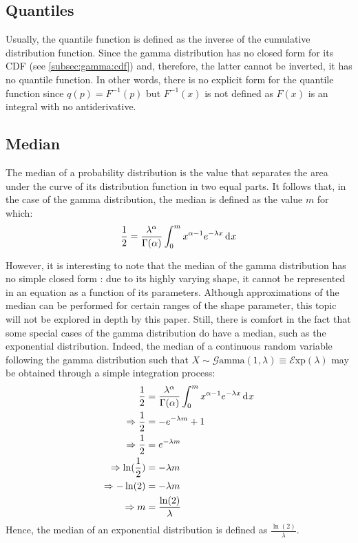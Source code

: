 \documentclass[12pt]{article}
\newcommand{\E}{\mathcal{E}}
\newcommand{\G}{\mathcal{G}}
\begin{document}
\pagebreak
\subsection{Quantiles \incomplete}

Usually, the quantile function is defined as the inverse of the cumulative distribution function. Since the gamma
distribution has no closed form for its CDF (see \autoref{subsec:gamma:cdf}) and, therefore, the latter cannot be
inverted, it has no quantile function. In other words, there is no explicit form for the quantile function since
$q(p)=F^{-1}(p)$ but $F^{-1}(x)$ is not defined as $F(x)$ is an integral with no antiderivative.

\subsection{Median }
The median of a probability distribution is the value that separates the area under the curve of its distribution
function in two equal parts. It follows that, in the case of the gamma distribution, the median is defined as the value
$m$ for which:
\begin{equation}
	\frac{1}{2} = \frac{\lambda^\alpha}{\Gamma(\alpha)} \int^m_0 x^{\alpha-1} e^{-\lambda x}\mathop{}\!\mathrm{d^{}}x
\end{equation}

However, it is interesting to note that the median of the gamma distribution has no simple closed form : due to its
highly varying shape, it cannot be represented in an equation as a function of its parameters. Although approximations
of the median can be performed for certain ranges of the shape parameter, this topic will not be explored in depth by
this paper. Still, there is comfort in the fact that some special cases of the gamma distribution do have a median, such
as the exponential distribution. Indeed, the median of a continuous random variable following the gamma distribution
such that $X\sim\G\text{amma}(1, \lambda)\equiv\E\text{xp}(\lambda)$ may be obtained through a simple integration
process:
\begin{equation}
	\begin{split}
		\frac{1}{2}					&=	\frac{\lambda^\alpha}{\Gamma(\alpha)} \int^m_0 x^{\alpha-1} e^{-\lambda x}\mathop{}\!\mathrm{d^{}}x\\
		\Rightarrow\frac{1}{2}		&=	-e^{-\lambda m} + 1\\
		\Rightarrow\frac{1}{2}		&=	e^{-\lambda m}\\
		\Rightarrow\ln(\frac{1}{2})	&=	-\lambda m\\
		\Rightarrow-\ln(2)			&=	-\lambda m\\
		\Rightarrow m				&=	\frac{\ln(2)}{\lambda}
	\end{split}
\end{equation}
Hence, the median of an exponential distribution is defined as $\frac{\ln(2)}{\lambda}$.
\end{document}
